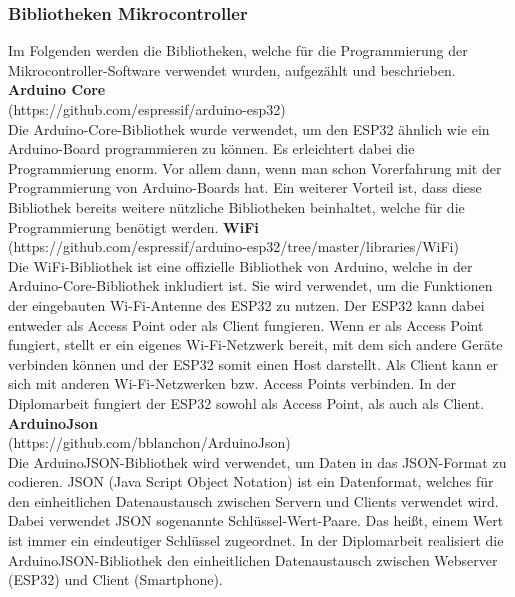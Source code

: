 \documentclass[11pt, twoside]{article}
\begin{document}
\subsubsection{Bibliotheken Mikrocontroller}
Im Folgenden werden die Bibliotheken, welche für die Programmierung der Mikrocontroller-Software verwendet wurden, aufgezählt und beschrieben.
\vspace{4mm}\newline
\textbf{Arduino Core} \\
(https://github.com/espressif/arduino-esp32) \\
Die \glqq Arduino-Core\grqq{}-Bibliothek wurde verwendet, um den ESP32 ähnlich wie ein Arduino-Board programmieren zu können. Es erleichtert dabei die Programmierung enorm. Vor allem dann, wenn man schon Vorerfahrung mit der Programmierung von Arduino-Boards hat. Ein weiterer Vorteil ist, dass diese Bibliothek bereits weitere nützliche Bibliotheken beinhaltet, welche für die Programmierung benötigt werden.
\vspace{4mm}\newline
\textbf{WiFi} \\
(https://github.com/espressif/arduino-esp32/tree/master/libraries/WiFi) \\
Die\grqq{} WiFi\grqq{}-Bibliothek ist eine offizielle Bibliothek von Arduino, welche in der\grqq{} Arduino-Core\grqq{}-Bibliothek inkludiert ist. Sie wird verwendet, um die Funktionen der eingebauten Wi-Fi-Antenne des ESP32 zu nutzen. Der ESP32 kann dabei entweder als Access Point oder als Client fungieren. Wenn er als Access Point fungiert, stellt er ein eigenes Wi-Fi-Netzwerk bereit, mit dem sich andere Geräte verbinden können und der ESP32 somit einen Host darstellt. Als Client kann er sich mit anderen Wi-Fi-Netzwerken bzw. Access Points verbinden. In der Diplomarbeit fungiert der ESP32 sowohl als Access Point, als auch als Client. \parencite[vgl.][]{noauthor_urlpi24_nodate}
\vspace{4mm}\newline
\textbf{ArduinoJson} \\
(https://github.com/bblanchon/ArduinoJson) \\
Die \glqq ArduinoJSON\grqq{}-Bibliothek wird verwendet, um Daten in das JSON-Format zu codieren. JSON (Java Script Object Notation) ist ein Datenformat, welches  für den einheitlichen Datenaustausch zwischen Servern und Clients verwendet wird. Dabei verwendet JSON sogenannte Schlüssel-Wert-Paare. Das heißt, einem Wert ist immer ein eindeutiger Schlüssel zugeordnet. In der Diplomarbeit realisiert die \glqq ArduinoJSON\grqq{}-Bibliothek den einheitlichen Datenaustausch zwischen Webserver (ESP32) und Client (Smartphone). \parencite[vgl.][]{noauthor_urlpi11_nodate}
\end{document}
